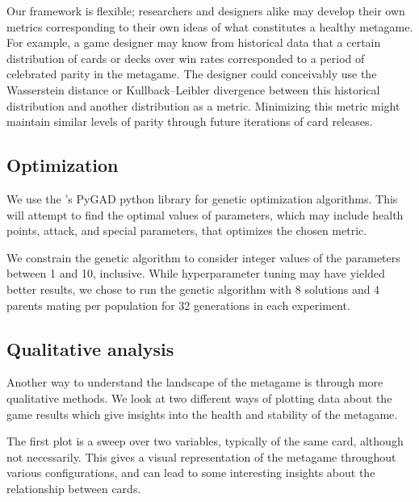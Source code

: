 Our framework is flexible; researchers and designers alike may develop their own metrics corresponding to their
own ideas of what constitutes a healthy metagame. For example, a game designer may know from historical data that
a certain distribution of cards or decks over win rates corresponded to a period of celebrated parity in the metagame. 
The designer could conceivably use the Wasserstein distance or Kullback--Leibler 
divergence between this historical distribution and another distribution as a metric. Minimizing this metric 
might maintain similar levels of parity through future iterations of card releases.

\subsection{Optimization}

We use the \citeauthor{gad2021pygad}'s  PyGAD python library for genetic optimization algorithms. This will attempt to find the optimal values of
parameters, which may include health points, attack, and special parameters, that optimizes
the chosen metric.

We constrain the genetic algorithm to consider integer values of the parameters between 1 and 10, inclusive. While hyperparameter tuning may have yielded better results,
we chose to run the genetic algorithm with 8 solutions and 4 parents mating per population for 32 generations in each experiment.

\subsection{Qualitative analysis}

Another way to understand the landscape of the metagame is through more qualitative methods. We look at two different ways of plotting data about the game results which give insights into the health and stability of the metagame. 

The first plot is a sweep over two variables, typically of the same card, although not necessarily. This gives a visual representation of the metagame throughout various configurations, and can lead to some interesting insights about the relationship between cards.

